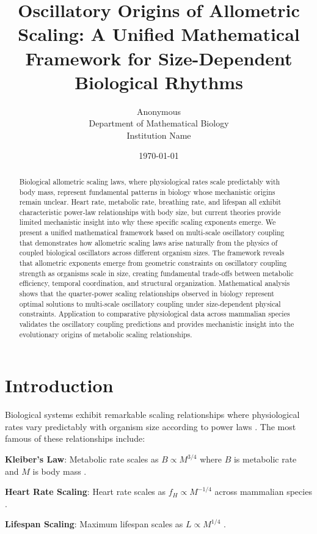 \documentclass[twocolumn]{article}
\title{Oscillatory Origins of Allometric Scaling: A Unified Mathematical Framework for Size-Dependent Biological Rhythms}
\author{
Anonymous\\
Department of Mathematical Biology\\
Institution Name
}
\date{\today}
\begin{document}
\maketitle

\begin{abstract}
Biological allometric scaling laws, where physiological rates scale predictably with body mass, represent fundamental patterns in biology whose mechanistic origins remain unclear. Heart rate, metabolic rate, breathing rate, and lifespan all exhibit characteristic power-law relationships with body size, but current theories provide limited mechanistic insight into why these specific scaling exponents emerge. We present a unified mathematical framework based on multi-scale oscillatory coupling that demonstrates how allometric scaling laws arise naturally from the physics of coupled biological oscillators across different organism sizes. The framework reveals that allometric exponents emerge from geometric constraints on oscillatory coupling strength as organisms scale in size, creating fundamental trade-offs between metabolic efficiency, temporal coordination, and structural organization. Mathematical analysis shows that the quarter-power scaling relationships observed in biology represent optimal solutions to multi-scale oscillatory coupling under size-dependent physical constraints. Application to comparative physiological data across mammalian species validates the oscillatory coupling predictions and provides mechanistic insight into the evolutionary origins of metabolic scaling relationships.
\end{abstract}

\section{Introduction}

Biological systems exhibit remarkable scaling relationships where physiological rates vary predictably with organism size according to power laws \citep{west1997general,brown2004toward}. The most famous of these relationships include:

\textbf{Kleiber's Law}: Metabolic rate scales as $B \propto M^{3/4}$ where $B$ is metabolic rate and $M$ is body mass \citep{kleiber1932body,west1997general}.

\textbf{Heart Rate Scaling}: Heart rate scales as $f_H \propto M^{-1/4}$ across mammalian species \citep{stahl1967scaling}.

\textbf{Lifespan Scaling}: Maximum lifespan scales as $L \propto M^{1/4}$ \citep{speakman2005body}.
\end{document}
